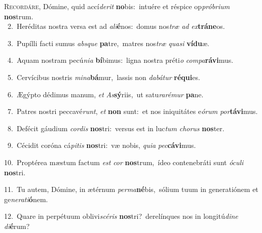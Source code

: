 \lettrine{\initial\textcolor{\initialcolor}{R}}{ecordáre,} Dómine, quid accí\-\textit{de}\-\textit{rit} \textbf{no}\-bis:~\star intuére et réspice op\-\textit{pró}\-\textit{bri}\textit{um} \textbf{nos}\-trum.\\
{\numbfont\textcolor{\numbcolor}{~2.}}~Heréditas nostra versa est ad \textit{a}\-\textit{li}\textbf{é}nos:~\star domus nos\textit{træ} \textit{ad} \textit{ex}\-\textbf{trá}\textbf{ne}os.\par
{\numbfont\textcolor{\numbcolor}{~3.}}~Pupílli facti sumus \textit{abs}\-\textit{que} \textbf{pa}\-tre,~\star matres nos\textit{træ} \textit{qua}\-\textit{si} \textbf{ví}\-\textbf{du}æ.\par
{\numbfont\textcolor{\numbcolor}{~4.}}~Aquam nostram pecú\-\textit{ni}\-\textit{a} \textbf{bí}\-bimus:~\star ligna nostra préti\textit{o} \textit{com}\-\textit{pa}\textbf{rá}\textbf{vi}mus.\par
{\numbfont\textcolor{\numbcolor}{~5.}}~Cervícibus nostris \textit{mi}\-\textit{na}\textbf{bá}mur,~\star lassis non \textit{da}\-\textit{bá}\textit{tur} \textbf{ré}\-\textbf{qui}es.\par
{\numbfont\textcolor{\numbcolor}{~6.}}~Ægýpto dédimus manum, \textit{et} \textit{As}\-\textbf{sý}riis,~\star ut satu\-\textit{ra}\-\textit{ré}\textit{mur} \textbf{pa}\-ne.\par
{\numbfont\textcolor{\numbcolor}{~7.}}~Patres nostri peccavé\-\textit{runt}\-, \textit{et} \textbf{non} sunt:~\star et nos iniquitátes e\-\textit{ó}\-\textit{rum} \textit{por}\-\textbf{tá}\textbf{vi}mus.\par
{\numbfont\textcolor{\numbcolor}{~8.}}~Defécit gáudium \textit{cor}\-\textit{dis} \textbf{nos}\-tri:~\star versus est in luc\textit{tum} \textit{cho}\-\textit{rus} \textbf{nos}\-ter.\par
{\numbfont\textcolor{\numbcolor}{~9.}}~Cécidit coróna cá\-\textit{pi}\-\textit{tis} \textbf{nos}\-tri:~\star væ nobis, \textit{qui}\-\textit{a} \textit{pec}\-\textbf{cá}\textbf{vi}mus.\par
{\numbfont\textcolor{\numbcolor}{10.}}~Proptérea mæstum factum \textit{est} \textit{cor} \textbf{nos}\-trum,~\star ídeo contenebráti sunt \textit{ó}\-\textit{cu}\textit{li} \textbf{nos}\-tri.\par
{\numbfont\textcolor{\numbcolor}{11.}}~Tu autem, Dómine, in ætérnum \textit{per}\-\textit{ma}\textbf{né}bis,~\star sólium tuum in generatiónem et ge\-\textit{ne}\-\textit{ra}\textit{ti}\textbf{ó}nem.\par
{\numbfont\textcolor{\numbcolor}{12.}}~Quare in perpétuum oblivi\-\textit{scé}\-\textit{ris} \textbf{nos}\-tri?~\star derelínques nos in longitú\-\textit{di}\-\textit{ne} \textit{di}\-\textbf{é}rum?\par
